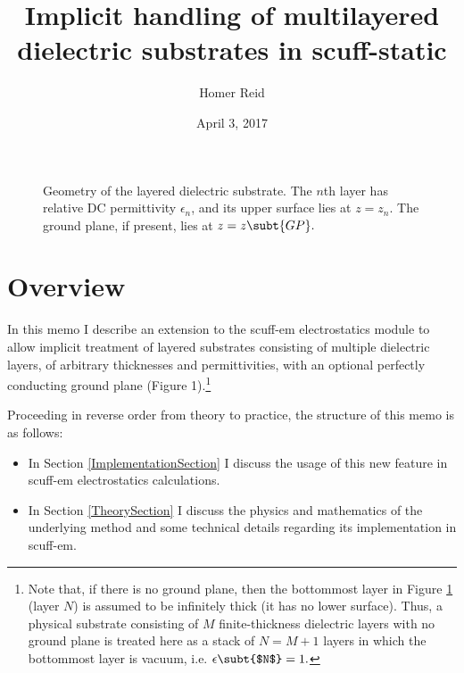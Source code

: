\documentclass[letterpaper]{article}
\title {Implicit handling of multilayered dielectric substrates 
        in {\sc scuff-static}
       }
\author {Homer Reid}
\date {April 3, 2017}
\begin{document}
\pagestyle{myheadings}
\maketitle

\tableofcontents

\newpage
\begin{figure}
\begin{center}
\caption{Geometry of the layered dielectric substrate. The $n$th layer
has relative DC permittivity $\epsilon_n$, and its upper surface
lies at $z=z_n$. The ground plane, if present, lies
at $z=z\subt{GP}.$}
\label{SubstrateGeometryFigure}
\end{center}
\end{figure}
\section{Overview}

In this memo I describe an extension to the {\sc scuff-em}
electrostatics module to allow implicit treatment of
layered substrates consisting of multiple dielectric layers,
of arbitrary thicknesses and permittivities, with an optional
perfectly conducting ground plane (Figure 1).\footnote{Note 
that, if there is no ground plane, then the bottommost 
layer in Figure \ref{SubstrateGeometryFigure}
(layer $N$) is assumed
to be infinitely thick (it has no lower surface). Thus, a physical 
substrate consisting of $M$ finite-thickness dielectric layers with 
no ground plane is treated here as a stack of $N=M+1$ layers in which
the bottommost layer is vacuum, i.e. $\epsilon\subt{$N$}=1.$}

Proceeding in reverse order from theory to practice, the 
structure of this memo is as follows:

\begin{itemize}
\item 
In Section \ref{ImplementationSection} I discuss the usage
of this new feature in {\sc scuff-em} electrostatics calculations.

\item 
In Section \ref{TheorySection} I discuss the physics and
mathematics of the underlying method and some technical details
regarding its implementation in {\sc scuff-em}.
\end{itemize}
\end{document}
